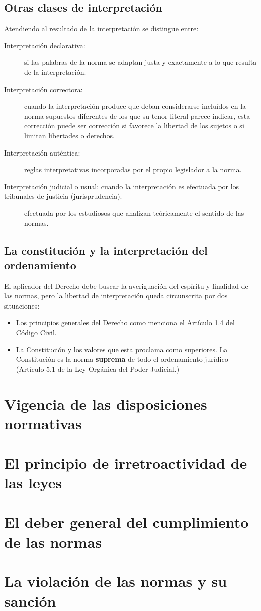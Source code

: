 \documentclass[a4paper,12pt]{report}
\begin{document}
\subsection{Otras clases de interpretación}

Atendiendo al resultado de la interpretación se distingue entre:
\begin{description}
\item[Interpretación declarativa:] si las palabras de la norma se adaptan justa y exactamente a lo que resulta de la interpretación.
\item[Interpretación correctora:] cuando la interpretación produce que deban considerarse incluídos en la norma supuestos diferentes de los que su tenor literal parece indicar, esta corrección puede ser corrección  si favorece la libertad de los sujetos o  si limitan libertades o derechos.
\item[Interpretación auténtica:] reglas interpretativas incorporadas por el propio legislador a la norma.
\item[Interpretación judicial o usual: cuando la interpretación es efectuada por los tribunales de justicia (jurisprudencia).
\item[Interpretación doctrinal:] efectuada por los estudiosos que analizan teóricamente el sentido de las normas.
\end{description}

\subsection{La constitución y la interpretación del ordenamiento}

El aplicador del Derecho debe buscar la averiguación del espíritu y finalidad de las normas, pero la libertad de interpretación queda circunscrita por dos situaciones:

\begin{itemize}
\item Los principios generales del Derecho como menciona el Artículo 1.4 del Código Civil.
\item La Constitución y los valores que esta proclama como superiores. La Constitución es la norma \textbf{suprema} de todo el ordenamiento jurídico (Artículo 5.1 de la Ley Orgánica del Poder Judicial.)
\end{itemize}

\section{Vigencia de las disposiciones normativas}
\section{El principio de irretroactividad de las leyes}
\section{El deber general del cumplimiento de las normas}
\section{La violación de las normas y su sanción}
\end{document}
